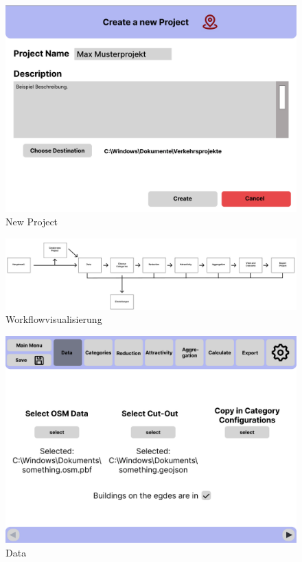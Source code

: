 \documentclass[parskip=full]{scrartcl} %
\begin{document}
\begin{figure}
    \centering
    \includegraphics[width=1\textwidth]{pictures/New Project.png}
    \caption{New Project}
\end{figure}

\begin{figure}
    \centering
    \includegraphics[width=1\textwidth]{pictures/WorkflowvisualisierungGUI.jpg}
    \caption{Workflowvisualisierung}
\end{figure}

\begin{figure}
    \centering
    \includegraphics[width=1\textwidth]{pictures/Data.png}
    \caption{Data}
\end{figure}
\end{document}
